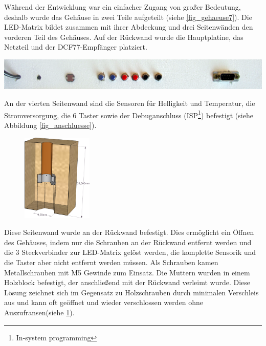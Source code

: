 Während der Entwicklung war ein einfacher Zugang von großer Bedeutung, deshalb
wurde das Gehäuse in zwei Teile aufgeteilt (siehe \ref{fig_gehaeuse7}). Die
LED-Matrix bildet zusammen mit ihrer Abdeckung und drei Seitenwänden den vorderen Teil des Gehäuses. Auf der Rückwand wurde die Hauptplatine, das Netzteil und der DCF77-Empfänger platziert. 
\begin{center}\includegraphics[width=\linewidth]{images/anschluesse.png}
\label{fig_anschluesse}\end{center}

An der vierten Seitenwand sind die Sensoren für Helligkeit und Temperatur, die
Stromversorgung, die 6 Taster sowie der Debuganschluss (ISP\footnote{In-system
programming}) befestigt (siehe Abbildung \ref{fig_anschluesse}).
\begin{figure}
\begin{center}
\includegraphics[width=0.3\textwidth]{skizzen/mutter_klotz.png}
\label{mutterklotz}
\end{center}
\end{figure}
 Diese
Seitenwand wurde an der Rückwand befestigt. Dies ermöglicht ein Öffnen des
Gehäuses, indem nur die Schrauben an der Rückwand entfernt werden und die 3
Steckverbinder zur LED-Matrix gelöst werden, die komplette Sensorik und die
Taster aber nicht entfernt werden müssen.
Als Schrauben kamen Metallschrauben mit M5 
Gewinde zum Einsatz. Die Muttern wurden in einem Holzblock befestigt, der anschließend mit der Rückwand verleimt wurde.
Diese Lösung zeichnet sich im Gegensatz zu Holzschrauben durch minimalen
Verschleis aus und kann oft geöffnet und wieder verschlossen werden ohne
Auszufransen(siehe \ref{mutterklotz}).
